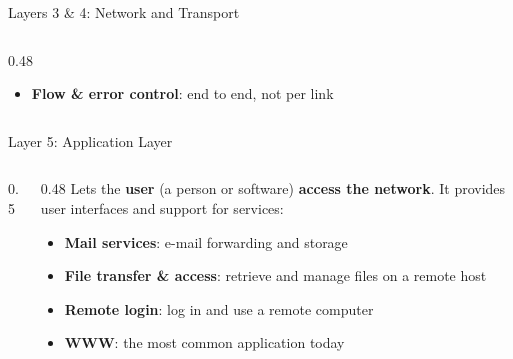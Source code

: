 \documentclass[aspectratio=169,11pt,xcolor={table}]{beamer}
\begin{document}
\begin{frame}{Layers 3 \& 4: Network and Transport}
\begin{columns}[T]
\begin{column}{0.48\textwidth}
\begin{itemize}
        \item \textbf{Flow \& error control}: end to end, not per link
      \end{itemize}
      \centering
    \end{column}
  \end{columns}
\end{frame}

\begin{frame}{Layer 5: Application Layer}
  \begin{columns}[c]
    \begin{column}{0.5\textwidth}
      \centering
    \end{column}
    \begin{column}{0.48\textwidth}
      Lets the \textbf{user} (a person or software) \textbf{access the network}. It provides user interfaces and support for services:
      \vspace{2mm}
      \begin{itemize}\small\setlength{\itemsep}{3pt}
        \item \textcolor{ocean}{\textbf{Mail services}}: e-mail forwarding and storage
        \item \textcolor{leaf!70!black}{\textbf{File transfer \& access}}: retrieve and manage files on a remote host
        \item \textcolor{grape}{\textbf{Remote login}}: log in and use a remote computer
        \item \textcolor{amber!80!black}{\textbf{WWW}}: the most common application today
      \end{itemize}
    \end{column}
  \end{columns}
\end{frame}
\end{document}
